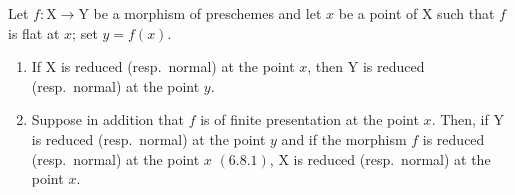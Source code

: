 \begin{proposition}[11.3.13]
\label{IV.11.3.13}
Let $f:\mathrm{X}\to\mathrm{Y}$ be a morphism of preschemes and let $x$ be a point of $\mathrm{X}$ such that $f$ is flat at $x$; set $y=f(x)$.
\begin{enumerate}[label=\emph{(\roman*)}]
  \item If $\mathrm{X}$ is reduced (resp.\ normal) at the point $x$, then $\mathrm{Y}$ is reduced (resp.\ normal) at the point $y$.
  \item Suppose in addition that $f$ is of finite presentation at the point $x$. Then, if $\mathrm{Y}$ is reduced (resp.\ normal) at the point $y$ and if the morphism $f$ is reduced (resp.\ normal) at the point $x$ $(6.8.1)$, $\mathrm{X}$ is reduced (resp.\ normal) at the point $x$.
\end{enumerate}
\end{proposition}

